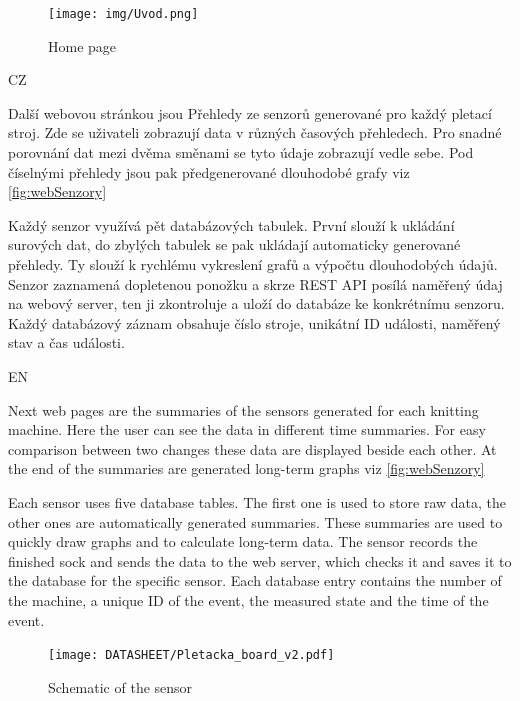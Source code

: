 \documentclass[12pt, a4paper]{article}
\begin{document}
\begin{figure}[t]
    \centering
    \texttt{[image: img/Uvod.png]}
    \caption{Home page}
    \label{fig:webUvod}
\end{figure}

CZ

Další webovou stránkou jsou Přehledy ze senzorů generované pro každý pletací stroj.
Zde se uživateli zobrazují data v různých časových přehledech.
Pro snadné porovnání dat mezi dvěma směnami se tyto údaje zobrazují vedle sebe.
Pod číselnými přehledy jsou pak předgenerované dlouhodobé grafy viz \ref{fig:webSenzory}

Každý senzor využívá pět databázových tabulek. První slouží k ukládání surových dat, do zbylých tabulek se pak ukládají automaticky generované přehledy.
Ty slouží k rychlému vykreslení grafů a výpočtu dlouhodobých údajů.
Senzor zaznamená dopletenou ponožku a skrze REST API posílá naměřený údaj na webový server, ten ji zkontroluje a uloží do databáze ke konkrétnímu senzoru.
Každý databázový záznam obsahuje číslo stroje, unikátní ID události, naměřený stav a čas události.

EN

Next web pages are the summaries of the sensors generated for each knitting machine.
Here the user can see the data in different time summaries.
For easy comparison between two changes these data are displayed beside each other.
At the end of the summaries are generated long-term graphs viz \ref{fig:webSenzory}

Each sensor uses five database tables. The first one is used to store raw data, the other ones are automatically generated summaries.
These summaries are used to quickly draw graphs and to calculate long-term data.
The sensor records the finished sock and sends the data to the web server, which checks it and saves it to the database for the specific sensor.
Each database entry contains the number of the machine, a unique ID of the event, the measured state and the time of the event.

% 
\begin{figure}[htbp]
    \centering
    \texttt{[image: DATASHEET/Pletacka\_board\_v2.pdf]}
    \caption{Schematic of the sensor}
    \label{fig:Schemav1}
\end{figure}
\end{document}

